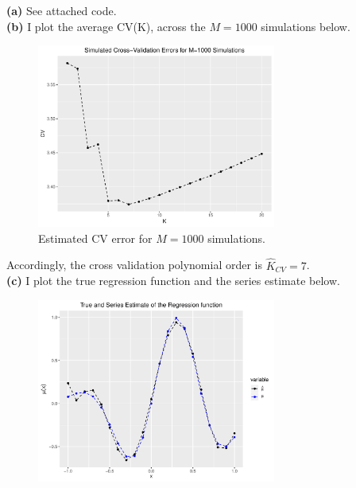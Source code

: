 \documentclass[12pt]{article}
\begin{document}
\textbf{(a)} See attached code.\\

\textbf{(b)} I plot the average CV(K), across the $M=1000$ simulations below. 

\begin{figure}[h!]
    \centering
    
        \includegraphics[width=0.7\textwidth]{Q2_CV.pdf}
        \caption{Estimated CV error for $M=1000$ simulations.}

\end{figure}
\newpage

Accordingly, the cross validation polynomial order is $\hat K_{CV} = 7 $.\\

\textbf{(c)} I plot the true regression function and the series estimate below.

\begin{figure}[h!]
    \centering
    
        \includegraphics[width=0.7\textwidth]{Q2_diag.pdf}
\end{figure}
\end{document}

